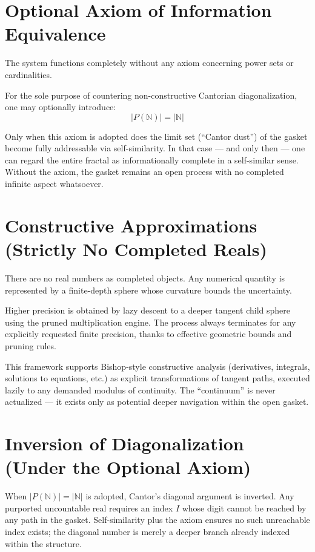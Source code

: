 \documentclass[11pt,oneside]{article}
\begin{document}
\section{Optional Axiom of Information Equivalence}
The system functions completely without any axiom concerning power sets or cardinalities. 

For the sole purpose of countering non-constructive Cantorian diagonalization, one may optionally introduce:
\begin{equation}
|P(\mathbb{N})| = |\mathbb{N}|
\end{equation}

Only when this axiom is adopted does the limit set (“Cantor dust”) of the gasket become fully addressable via self-similarity. In that case — and only then — one can regard the entire fractal as informationally complete in a self-similar sense. Without the axiom, the gasket remains an open process with no completed infinite aspect whatsoever.

\section{Constructive Approximations (Strictly No Completed Reals)}
There are no real numbers as completed objects. Any numerical quantity is represented by a finite-depth sphere whose curvature bounds the uncertainty. 

Higher precision is obtained by lazy descent to a deeper tangent child sphere using the pruned multiplication engine. The process always terminates for any explicitly requested finite precision, thanks to effective geometric bounds and pruning rules.

This framework supports Bishop-style constructive analysis (derivatives, integrals, solutions to equations, etc.) as explicit transformations of tangent paths, executed lazily to any demanded modulus of continuity. The “continuum” is never actualized — it exists only as potential deeper navigation within the open gasket.

\section{Inversion of Diagonalization (Under the Optional Axiom)}
When \( |P(\mathbb{N})| = |\mathbb{N}| \) is adopted, Cantor’s diagonal argument is inverted. Any purported uncountable real requires an index \( I \) whose digit cannot be reached by any path in the gasket. Self-similarity plus the axiom ensures no such unreachable index exists; the diagonal number is merely a deeper branch already indexed within the structure.
\end{document}
